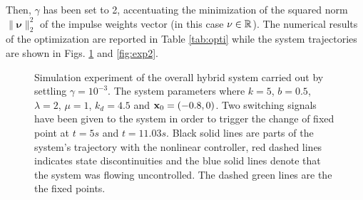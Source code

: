 Then, $\gamma$ has been set to 2, accentuating the minimization of the squared norm $\|\bm\nu\|_2^2$ of the impulse weights vector (in this case $\nu\in\mathbb{R}$). The numerical results of the optimization are reported in Table \ref{tab:opti} while the system trajectories are shown in Figs. \ref{fig:exp1} and \ref{fig:exp2}. 
%
\begin{table}[!ht]
    \caption{Hybrid controller optimization results.}
	\centering
	\label{tab:opti}
\end{table}	
%
\begin{figure}[!ht]
    \centering
    \caption[Simulation experiment of the overall hybrid system with $\gamma = 10^{-3}$]{Simulation experiment of the overall hybrid system carried out by settling $\gamma = 10^{-3}$. The system parameters where $k = 5$, $b = 0.5$, $\lambda = 2$, $\mu = 1$, $k_d = 4.5$ and $\mathbf{x}_0 = (-0.8,0)$. 
    Two switching signals have been given to the system in order to trigger the change of fixed point at $t = 5s$ and $t = 11.03s$. Black solid lines are parts of the system's trajectory with the nonlinear controller, red dashed lines indicates state discontinuities and the blue solid lines denote that the system was flowing uncontrolled. The dashed green lines are the the fixed points.
    }
    \label{fig:exp1}
\end{figure}

